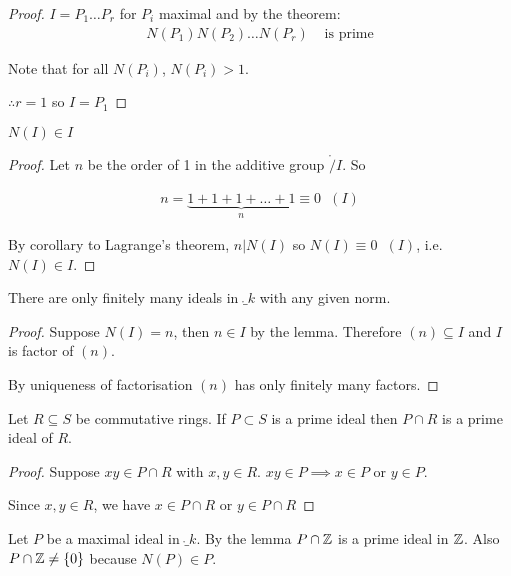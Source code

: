 \documentclass[11pt]{article}
\begin{document}
\begin{proof}
$I = P_1\dots P_r$ for $P_i$ maximal and by the theorem:
	\begin{align*}
		N(P_1)N(P_2) \dots N(P_r) & \text{ is prime} 
	\end{align*}
	
	Note that for all $N(P_i)$, $ N(P_i) > 1$.

$\therefore r =1$ so $I=P_1$
\end{proof}


\begin{lemma}
	$N(I) \in I$
\end{lemma}


\begin{proof}
Let $n$ be the order of 1 in the additive group $\ring/I$.
So

	\begin{align*}
		n = \underbrace{1 + 1 +1+\dots +1}_n \equiv 0 \hspace{7pt} (I)
	\end{align*}

	By corollary to Lagrange's theorem, $n | N(I) $ so $N(I) \equiv 0 \hspace{7pt} (I)$, i.e. $N(I) \in I$.
\end{proof}

\begin{cor}
There are only finitely many ideals in $\ring_k$ with any given norm.
\end{cor}
\begin{proof}
	Suppose $N(I) = n$, then $n \in I$ by the lemma.
	Therefore $(n) \subseteq I$ and $I$ is factor of $(n)$.
\spa

	By uniqueness of factorisation $(n)$ has only finitely many factors.
\end{proof}

\begin{lemma}
Let $R \subseteq S$ be commutative rings.
If $P \subset S$ is a prime ideal then $P \cap R$ is a prime ideal of $R$.
\end{lemma}


\begin{proof}
Suppose $xy \in P \cap R$ with $x,y \in R$. $xy \in P \implies x \in P $ or $y \in P$.
\spa

Since $x, y \in R$, we have $x \in P \cap R $ or $y \in P \cap R$
\end{proof}
\spa
Let $P$ be a maximal ideal in $\ring_k$.
By the lemma $P \cap \mathbb{Z}$ is a prime ideal in $\mathbb{Z}$.
Also $P \cap \mathbb{Z} \neq \{0\}$ because $N(P) \in P$.
\end{document}
